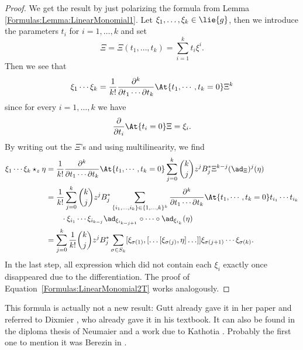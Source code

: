 \begin{proof}
	We get the result by just polarizing the formula from Lemma 
	\ref{Formulas:Lemma:LinearMonomial1}. Let $\xi_1, \ldots, \xi_k \in 
	\lie{g}$, then we introduce the parameters $t_i$ for $i = 
	1, \ldots, k$ and set
	\begin{equation*}
		\Xi
		=		
		\Xi(t_1, \ldots, t_k)
		=
		\sum\limits_{i=1}^k t_i \xi^i.
	\end{equation*}
	Then we see that
	\begin{equation*}
		\xi_1 \cdots \xi_k
		=
		\frac{1}{k!}
		\frac{\partial^k}{\partial t_1 \cdots \partial t_k}
		\At{t_1, \cdots, t_k = 0}
		\Xi^k
	\end{equation*}
	since for every $i = 1, \ldots, k$ we have
	\begin{equation}\label{Formulas:LittleHelp1}
		\frac{\partial}{\partial t_i}
		\At{t_i = 0} \Xi
		=
		\xi_i.
	\end{equation}
	By writing out the $\Xi$'s and using multilinearity, we find
	\begin{align*}
		\xi_1 \cdots \xi_k \star_z \eta
		& =
		\frac{1}{k!}
		\frac{\partial^k}{\partial t_1 \cdots \partial t_k}
		\At{t_1, \cdots, t_k = 0}
        \sum\limits_{j=0}^k
        \binom{k}{j} z^j B_j^*
        \Xi^{k-j}(\ad_{\Xi})^j (\eta)
        \\
        & =
		\frac{1}{k!}
        \sum\limits_{j=0}^k
        \binom{k}{j} z^j B_j^*
		\sum\limits_{
			\{i_1, \ldots, i_k\}
			\in
			\{1, \ldots, k\}^k
		}
		\frac{\partial^k}{\partial t_1 \cdots \partial t_k}
		\At{t_1, \cdots, t_k = 0}
        t_{i_1} \cdots t_{i_k}
        \\
        & \qquad
        \cdot
        \xi_{i_1} \cdots \xi_{i_{k-j}}
        \ad_{\xi_{i_{k-j+1}}} 
        \circ \cdots \circ  
        \ad_{\xi_{i_k}}
        (\eta)
        \\
        & =
    		\sum\limits_{j=0}^k
    		\frac{1}{k!} \binom{k}{j}
    		z^j B_j^*
    		\sum\limits_{\sigma \in S_k}
    		[\xi_{\sigma(1)}, 
    			[ \ldots [\xi_{\sigma(j)}, \eta] \ldots ]
    		]
    		\xi_{\sigma(j+1)} \cdots \xi_{\sigma(k)}.
	\end{align*}
	In the last step, all expression which did not contain each $\xi_i$ 
	exactly once disappeared due to the differentiation. The proof of 
	Equation~\eqref{Formulas:LinearMonomial2T} works analogously.
\end{proof}
\begin{remark}
	\label{Formulas:Rem:EasierFormulaAlreadyKnown}
	This formula is actually not a new result: Gutt already gave it in her 
	paper \cite[Prop. 1]{gutt:1983a} and referred to Dixmier 
	\cite[part 2.8.12 (c)]{dixmier:1977a}, who already gave it in his 
	textbook. It can also be found in the diploma thesis of Neumaier 
	\cite[Rem. 5.2.8]{neumaier:1998a} and a work due to Kathotia 
	\cite[Eq. 2.23]{kathotia:1998a:pre}. Probably the first one to mention it 
	was Berezin in \cite[Eq. 30]{berezin:1967a}.
\end{remark}



